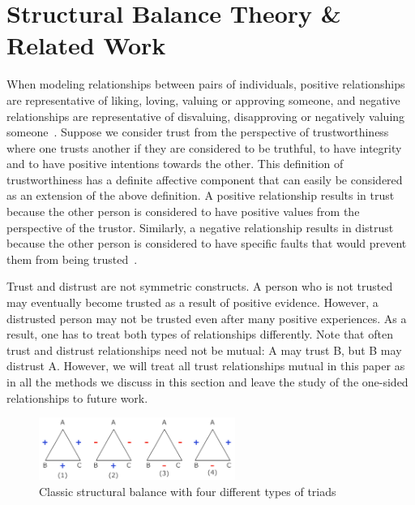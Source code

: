 

\section{Structural Balance Theory \& Related Work} 
When modeling relationships between pairs of individuals, positive
relationships are representative of liking, loving, valuing or
approving someone, and negative relationships are representative of
disvaluing, disapproving or negatively valuing
someone~\cite{Cartwright:56}. Suppose we consider trust from the
perspective of trustworthiness where one trusts another if they are
considered to be truthful, to have integrity and to have positive
intentions towards the other. This definition of trustworthiness has a
definite affective component that can easily be considered as an
extension of the above definition. A positive relationship results in
trust because the other person is considered to have positive values
from the perspective of the trustor. Similarly, a negative
relationship results in distrust because the other person is
considered to have specific faults that would prevent them from being
trusted~\cite{Adali:2013}.

Trust and distrust are not symmetric constructs. A person who is not
trusted may eventually become trusted as a result of positive
evidence. However, a distrusted person may not be trusted even after
many positive experiences. As a result, one has to treat both types of
relationships differently. Note that often trust and distrust
relationships need not be mutual: A may trust B, but B may distrust
A. However, we will treat all trust relationships mutual in this paper
as in all the methods we discuss in this section and leave the study
of the one-sided relationships to future work.

\begin{figure}[th]
\centering
\includegraphics[height=0.8in]{Figs/strongBalance_ver.pdf}
\vspace*{-0.1in}
\caption{\label{fig:balance_strong} Classic structural balance with four different types of triads}
\end{figure}

